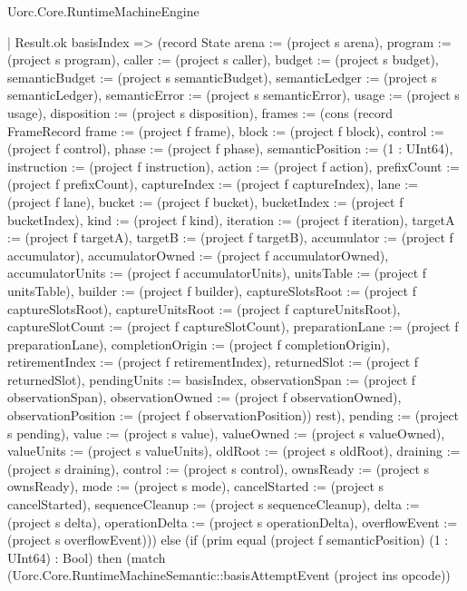 \begin{lexlean}{Uorc.Core.RuntimeMachineEngine}
\begin{semanticmodule}
{        | Result.ok basisIndex => (record State {arena := (project s arena), program := (project s program), caller := (project s caller), budget := (project s budget), semanticBudget := (project s semanticBudget), semanticLedger := (project s semanticLedger), semanticError := (project s semanticError), usage := (project s usage), disposition := (project s disposition), frames := (cons (record FrameRecord {frame := (project f frame), block := (project f block), control := (project f control), phase := (project f phase), semanticPosition := (1 : UInt64), instruction := (project f instruction), action := (project f action), prefixCount := (project f prefixCount), captureIndex := (project f captureIndex), lane := (project f lane), bucket := (project f bucket), bucketIndex := (project f bucketIndex), kind := (project f kind), iteration := (project f iteration), targetA := (project f targetA), targetB := (project f targetB), accumulator := (project f accumulator), accumulatorOwned := (project f accumulatorOwned), accumulatorUnits := (project f accumulatorUnits), unitsTable := (project f unitsTable), builder := (project f builder), captureSlotsRoot := (project f captureSlotsRoot), captureUnitsRoot := (project f captureUnitsRoot), captureSlotCount := (project f captureSlotCount), preparationLane := (project f preparationLane), completionOrigin := (project f completionOrigin), retirementIndex := (project f retirementIndex), returnedSlot := (project f returnedSlot), pendingUnits := basisIndex, observationSpan := (project f observationSpan), observationOwned := (project f observationOwned), observationPosition := (project f observationPosition)}) rest), pending := (project s pending), value := (project s value), valueOwned := (project s valueOwned), valueUnits := (project s valueUnits), oldRoot := (project s oldRoot), draining := (project s draining), control := (project s control), ownsReady := (project s ownsReady), mode := (project s mode), cancelStarted := (project s cancelStarted), sequenceCleanup := (project s sequenceCleanup), delta := (project s delta), operationDelta := (project s operationDelta), overflowEvent := (project s overflowEvent)})) else (if (prim equal (project f semanticPosition) (1 : UInt64) : Bool) then (match (Uorc.Core.RuntimeMachineSemantic::basisAttemptEvent (project ins opcode))
}
\end{semanticmodule}
\end{lexlean}
